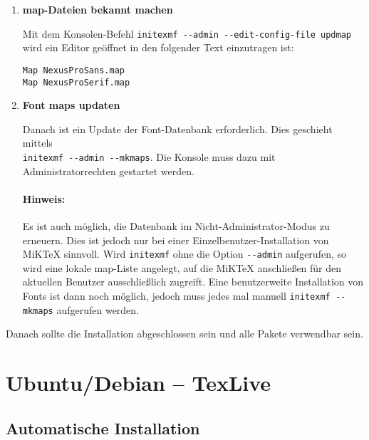 \begin{description}
    \begin{enumerate}

      \item {\bfseries map-Dateien bekannt machen}

      Mit dem Konsolen-Befehl \lstinline{initexmf --admin --edit-config-file updmap}
      wird ein Editor geöffnet in den folgender Text einzutragen ist:

      \begin{lstlisting}
Map NexusProSans.map
Map NexusProSerif.map
      \end{lstlisting}

      \item {\bfseries Font maps updaten}

        Danach ist ein Update der Font-Datenbank erforderlich. Dies geschieht
        mittels\\ \lstinline{initexmf --admin --mkmaps}. Die Konsole muss dazu
        mit Administratorrechten gestartet werden.

        \paragraph{Hinweis:} Es ist auch möglich, die Datenbank im 
          Nicht-Administrator-Modus zu erneu\-ern. Dies ist jedoch nur bei einer
          Einzelbenutzer-Installation von MiKTeX sinnvoll. Wird
          \lstinline{initexmf} ohne die Option \lstinline{--admin} aufgerufen,
          so wird eine lokale map-Liste angelegt, auf die MiKTeX anschließen für
          den aktuellen Benutzer ausschließlich zugreift.
          Eine benutzerweite Installation von Fonts ist dann noch 
          möglich, jedoch muss jedes mal manuell \lstinline{initexmf --mkmaps}
          aufgerufen werden.
    \end{enumerate}

    Danach sollte die Installation abgeschlossen sein und alle Pakete verwendbar 
    sein.
\end{description}


\clearpage
\section{Ubuntu/Debian -- TexLive}

\subsection{Automatische Installation}

